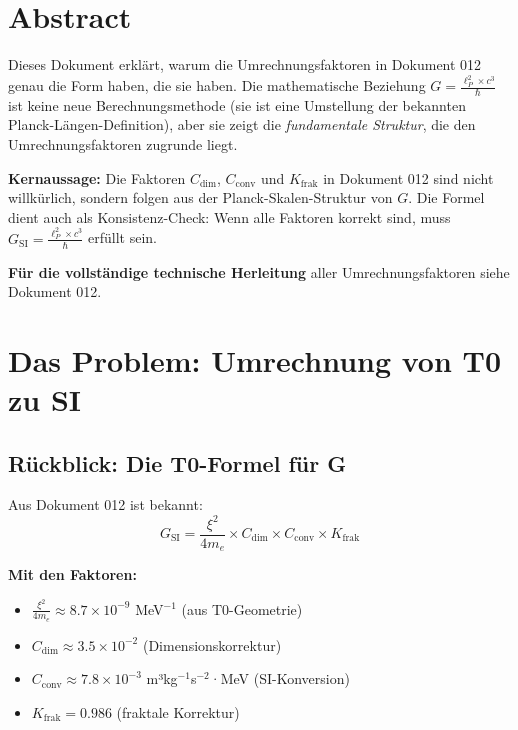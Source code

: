 \section*{Abstract}
		Dieses Dokument erklärt, warum die Umrechnungsfaktoren in Dokument 012 genau die Form haben, die sie haben. Die mathematische Beziehung $G = \frac{\ell_P^2 \times c^3}{\hbar}$ ist keine neue Berechnungsmethode (sie ist eine Umstellung der bekannten Planck-Längen-Definition), aber sie zeigt die \textit{fundamentale Struktur}, die den Umrechnungsfaktoren zugrunde liegt.
		
		\textbf{Kernaussage:} Die Faktoren $C_{\text{dim}}$, $C_{\text{conv}}$ und $K_{\text{frak}}$ in Dokument 012 sind nicht willkürlich, sondern folgen aus der Planck-Skalen-Struktur von $G$. Die Formel dient auch als Konsistenz-Check: Wenn alle Faktoren korrekt sind, muss $G_{\text{SI}} = \frac{\ell_P^2 \times c^3}{\hbar}$ erfüllt sein.
		
		\textbf{Für die vollständige technische Herleitung} aller Umrechnungsfaktoren siehe Dokument 012.

	
	
	\section{Das Problem: Umrechnung von T0 zu SI}
	
	\subsection{Rückblick: Die T0-Formel für G}
	
	Aus Dokument 012 ist bekannt:
	\begin{equation}
		G_{\text{SI}} = \frac{\xi^2}{4m_e} \times C_{\text{dim}} \times C_{\text{conv}} \times K_{\text{frak}}
	\end{equation}
	
	\textbf{Mit den Faktoren:}
	\begin{itemize}
		\item $\frac{\xi^2}{4m_e} \approx 8.7 \times 10^{-9}$ MeV$^{-1}$ (aus T0-Geometrie)
		\item $C_{\text{dim}} \approx 3.5 \times 10^{-2}$ (Dimensionskorrektur)
		\item $C_{\text{conv}} \approx 7.8 \times 10^{-3}$ m³kg$^{-1}$s$^{-2}$·MeV (SI-Konversion)
		\item $K_{\text{frak}} = 0.986$ (fraktale Korrektur)
	\end{itemize}
	
